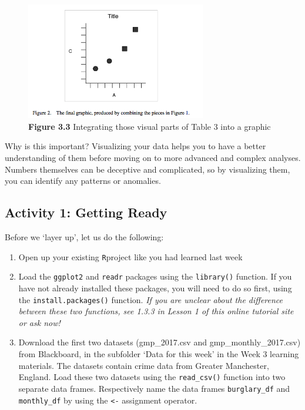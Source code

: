 \documentclass[
]{book}
\begin{document}
\begin{figure}
\centering
\includegraphics[width=0.7\textwidth,height=\textheight]{Images/grammar3.png}
\caption{\textbf{Figure 3.3} Integrating those visual parts of Table 3 into a graphic}
\end{figure}

Why is this important? Visualizing your data helps you to have a better understanding of them before moving on to more advanced and complex analyses. Numbers themselves can be deceptive and complicated, so by visualizing them, you can identify any patterns or anomalies.

\hypertarget{activity-1-getting-ready}{%
\subsection{Activity 1: Getting Ready}\label{activity-1-getting-ready}}

Before we `layer up', let us do the following:

\begin{enumerate}
\def\labelenumi{\arabic{enumi}.}
\item
  Open up your existing \texttt{R}project like you had learned last week
\item
  Load the \texttt{ggplot2} and \texttt{readr} packages using the \texttt{library()} function. If you have not already installed these packages, you will need to do so first, using the \texttt{install.packages()} function. \emph{If you are unclear about the difference between these two functions, see 1.3.3 in Lesson 1 of this online tutorial site or ask now!}
\item
  Download the first two datasets (gmp\_2017.csv and gmp\_monthly\_2017.csv) from Blackboard, in the subfolder `Data for this week' in the Week 3 learning materials. The datasets contain crime data from Greater Manchester, England. Load these two datasets using the \texttt{read\_csv()} function into two separate data frames. Respectively name the data frames \texttt{burglary\_df} and \texttt{monthly\_df} by using the \texttt{\textless{}-} assignment operator.
\end{enumerate}
\end{document}
